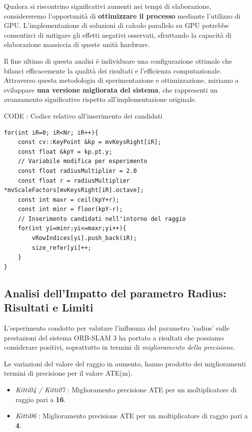 \documentclass[12pt,a4paper]{report}
\begin{document}
Qualora si riscontrino significativi aumenti nei tempi di elaborazione, considereremo l'opportunità di \textbf{ottimizzare il processo} mediante l'utilizzo di GPU. L'implementazione di soluzioni di calcolo parallelo su GPU potrebbe consentirci di mitigare gli effetti negativi osservati, sfruttando la capacità di elaborazione massiccia di queste unità hardware.

Il fine ultimo di questa analisi è individuare una configurazione ottimale che bilanci efficacemente la qualità dei risultati e l'efficienza computazionale. Attraverso questa metodologia di sperimentazione e ottimizzazione, miriamo a sviluppare \textbf{una versione migliorata del sistema}, che rappresenti un avanzamento significativo rispetto all'implementazione originale.

\vspace{1cm}

CODE : Codice relativo all'inserimento dei candidati
\begin{lstlisting}
for(int iR=0; iR<Nr; iR++){
    const cv::KeyPoint &kp = mvKeysRight[iR];
    const float &kpY = kp.pt.y;
    // Variabile modifica per esperimento
    const float radiusMultiplier = 2.0 
    const float r = radiusMultiplier *mvScaleFactors[mvKeysRight[iR].octave];  
    const int maxr = ceil(kpY+r);
    const int minr = floor(kpY-r);
    // Inserimento candidati nell'intorno del raggio
    for(int yi=minr;yi<=maxr;yi++){
        vRowIndices[yi].push_back(iR);
        size_refer[yi]++;   
    }
}
\end{lstlisting}

\vspace{4cm}

\subsection{Analisi dell'Impatto del parametro Radius: Risultati e Limiti}

L'esperimento condotto per valutare l'influenza del parametro 'radius' sulle prestazioni del sistema ORB-SLAM 3 ha portato a risultati che possiamo considerare positivi, soprattutto in termini di \textit{miglioramento della precisione}.

Le variazioni del valore del raggio in aumento, hanno prodotto dei miglioramenti termini di precisione per il valore ATE(m).

\begin{itemize}
    \item \textit{Kitti04 / Kitti07} : Miglioramento precisione ATE per un moltiplicatore di raggio pari a \textbf{16}.
    \item \textit{Kitti06} : Miglioramento precisione ATE per un moltiplicatore di raggio pari a \textbf{4}.
\end{itemize}
\end{document}
